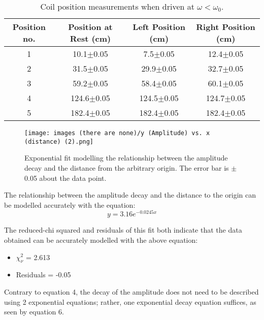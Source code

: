 \documentclass[12pt, letterpaper, twoside]{article}
\begin{document}
\begin{table}[!ht]
    \centering
        \begin{tabular}{|c|c|c|c|}
            \hline
            Position no. & Position at Rest (cm) & Left Position (cm) & Right Position (cm)\\
            \hline
            1 & 10.1$\pm$0.05 & 7.5$\pm$0.05 & 12.4$\pm$0.05 \\
            \hline
            2 & 31.5$\pm$0.05 & 29.9$\pm$0.05 & 32.7$\pm$0.05 \\
            \hline
            3 & 59.2$\pm$0.05 & 58.4$\pm$0.05 & 60.1$\pm$0.05 \\
            \hline
            4 & 124.6$\pm$0.05 & 124.5$\pm$0.05 & 124.7$\pm$0.05 \\
            \hline
            5 & 182.4$\pm$0.05 & 182.4$\pm$0.05 & 182.4$\pm$0.05 \\
            \hline
        \end{tabular}
    \caption{Coil position measurements when driven at $\omega < \omega_0$.}
    \label{tab:my_label}
\end{table}


\begin{figure}[!ht]
    \centering
    \texttt{[image: images (there are none)/y (Amplitude) vs. x (distance) (2).png]}
    \caption{Exponential fit modelling the relationship between the amplitude decay and the distance from the arbitrary origin. The error bar is $\pm$0.05 about the data point.}
    \label{fig:my_label}
\end{figure}

The relationship between the amplitude decay and the distance to the origin can be modelled accurately with the equation: 
\begin{equation}
    y = 3.16e^{-0.0245x}
\end{equation}

The reduced-chi squared and residuals of this fit both indicate that the data obtained can be accurately modelled with the above equation:

\vspace{-1.5em}

\begin{itemize}
    \item $\chi^2_\nu$ = 2.613
    \item Residuals = -0.05
\end{itemize}

Contrary to equation 4, the decay of the amplitude does not need to be described using 2 exponential equations; rather, one exponential decay equation suffices, as seen by equation 6.
\end{document}
